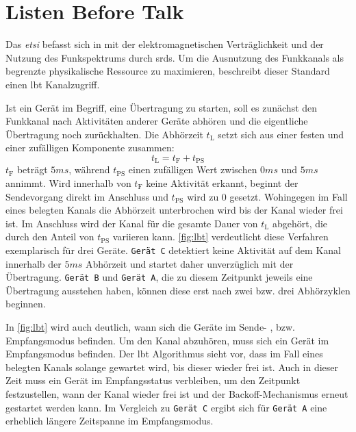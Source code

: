 \section{Listen Before Talk}\label{kap:zugriffsverfahren_sec:lbt}
Das \emph{\ac{etsi}} befasst sich in \citep{lbt} mit der elektromagnetischen Verträglichkeit und der Nutzung des Funkspektrums durch \acp{srd}. Um die Ausnutzung des Funkkanals als begrenzte physikalische Ressource zu maximieren, beschreibt dieser Standard einen \ac{lbt} Kanalzugriff. 

Ist ein Gerät im Begriff, eine Übertragung zu starten, soll es zunächst den Funkkanal nach Aktivitäten anderer Geräte abhören und die eigentliche Übertragung noch zurückhalten. Die Abhörzeit $t_{\textrm{L}}$ setzt sich aus einer festen und einer zufälligen Komponente zusammen:
\begin{equation}
{t_{\textrm{L}}} = {t_{\textrm{F}}} + {t_{\textrm{PS}}}
\end{equation}
${t_{\textrm{F}}}$ beträgt $5ms$, während ${t_{\textrm{PS}}}$ einen zufälligen Wert zwischen $0ms$ und $5ms$ annimmt. Wird innerhalb von ${t_{\textrm{F}}}$ keine Aktivität erkannt, beginnt der Sendevorgang direkt im Anschluss und ${t_{\textrm{PS}}}$ wird zu $0$ gesetzt. Wohingegen im Fall eines belegten Kanals die Abhörzeit unterbrochen wird bis der Kanal wieder frei ist. Im Anschluss wird der Kanal für die gesamte Dauer von ${t_{\textrm{L}}}$ abgehört, die durch den Anteil von ${t_{\textrm{PS}}}$ variieren kann. \autoref{fig:lbt} verdeutlicht diese Verfahren exemplarisch für drei Geräte. \texttt{Gerät C} detektiert keine Aktivität auf dem Kanal innerhalb der $5ms$ Abhörzeit und startet daher unverzüglich mit der Übertragung. \texttt{Gerät B} und \texttt{Gerät A}, die zu diesem Zeitpunkt jeweils eine Übertragung ausstehen haben, können diese erst nach zwei bzw. drei Abhörzyklen beginnen.

In \autoref{fig:lbt} wird auch deutlich, wann sich die Geräte im Sende- , bzw. Empfangsmodus befinden. Um den Kanal abzuhören, muss sich ein Gerät im Empfangsmodus befinden. Der \ac{lbt} Algorithmus sieht vor, dass im Fall eines belegten Kanals solange gewartet wird, bis dieser wieder frei ist. Auch in dieser Zeit muss ein Gerät im Empfangsstatus verbleiben, um den Zeitpunkt festzustellen, wann der Kanal wieder frei ist und der Backoff-Mechanismus erneut gestartet werden kann. Im Vergleich zu \texttt{Gerät C} ergibt sich für \texttt{Gerät A} eine erheblich längere Zeitspanne im Empfangsmodus.

